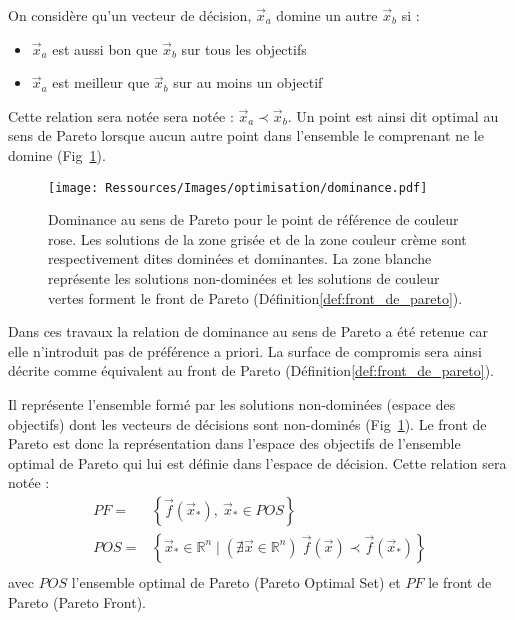 \begin{Def}\label{def:dominance_de_pareto}
On considère qu’un vecteur de décision, $\vec{x}_{a}$ domine un autre $\vec{x}_{b}$ si :
\begin{itemize}
  \item $\vec{x}_{a}$ est aussi bon que $\vec{x}_{b}$ sur tous les objectifs
  \item $\vec{x}_{a}$ est meilleur que $\vec{x}_{b}$ sur au moins un objectif
\end{itemize}
Cette relation sera notée sera notée : $\vec{x}_{a} \prec \vec{x}_{b}$.
Un point est ainsi dit optimal au sens de Pareto lorsque aucun autre point dans
l’ensemble le comprenant ne le domine (Fig~\ref{fig:dominance_pareto}).
\end{Def}

\begin{figure}
    \begin{center}
        \texttt{[image: Ressources/Images/optimisation/dominance.pdf]}
    \end{center}
    \caption{Dominance au sens de Pareto pour le point de référence de couleur rose.
             Les solutions de la zone grisée et de la zone couleur crème sont respectivement
             dites dominées et dominantes. La zone blanche représente les solutions
             non-dominées et les solutions de couleur vertes forment le front de
             Pareto (Définition\ref{def:front_de_pareto}).
             \label{fig:dominance_pareto}}
\end{figure}

Dans ces travaux la relation de dominance au sens de Pareto a été retenue car
elle n’introduit pas de préférence a priori. La surface de compromis sera ainsi
décrite comme équivalent au front de Pareto (Définition\ref{def:front_de_pareto}).


\begin{Def}\label{def:front_de_pareto}
Il représente l’ensemble formé par les solutions non-dominées (espace des objectifs)
dont les vecteurs de décisions sont non-dominés (Fig~\ref{fig:dominance_pareto}).
Le front de Pareto est donc la représentation dans l’espace des objectifs
de l’ensemble optimal de Pareto qui lui est définie dans l’espace de décision.
Cette relation sera notée :
\begin{equation}
  \begin{aligned}
    PF   =& \left\{ \vec{f}(\vec{x}_{*}), \  \vec{x}_{*} \in POS \right\} \\
    POS  =& \left\{ \vec{x}_{*} \in \mathbb{R}^{n} \mid (\nexists \vec{x} \in
            \mathbb{R}^{n}) \  \vec{f}(\vec{x}) \prec \vec{f}(\vec{x}_{*}) \right\} \\
  \end{aligned}
\end{equation}
avec $POS$ l’ensemble optimal de Pareto (Pareto Optimal Set) et $PF$ le front de Pareto
(Pareto Front).
\end{Def}


